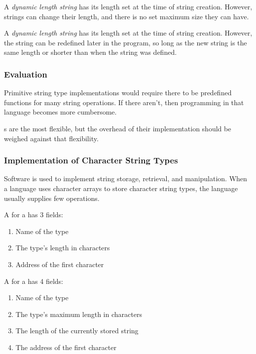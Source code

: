 \begin{definition}\label{def:Dynamic_Length_String}
  A \emph{dynamic length string} has its length set at the time of string creation.
  However, strings can change their length, and there is no set maximum size they can have.
\end{definition}

\begin{definition}\label{def:Limited_Dynamic_Length_String}
  A \emph{dynamic length string} has its length set at the time of string creation.
  However, the string can be redefined later in the program, so long as the new string is the same length or shorter than when the string  was defined.
\end{definition}

\subsubsection{Evaluation}\label{subsubsec:String_Type_Evaluation}
Primitive string type implementations would require there to be predefined functions for many string operations.
If there aren't, then programming in that language becomes more cumbersome.

s are the most flexible, but the overhead of their implementation should be weighed against that flexibility.

\subsubsection{Implementation of Character String Types}\label{subsubsec:Implementation_of_Character_String_Types}
Software is used to implement string storage, retrieval, and manipulation.
When a language uses character arrays to store character string types, the language usually supplies few operations.

A  for a  has 3 fields:
\begin{enumerate}[noitemsep]
\item Name of the type
\item The type's length in characters
\item Address of the first character
\end{enumerate}

A  for a  has 4 fields:
\begin{enumerate}[noitemsep]
\item Name of the type
\item The type's maximum length in characters
\item The length of the currently stored string
\item The address of the first character
\end{enumerate}


